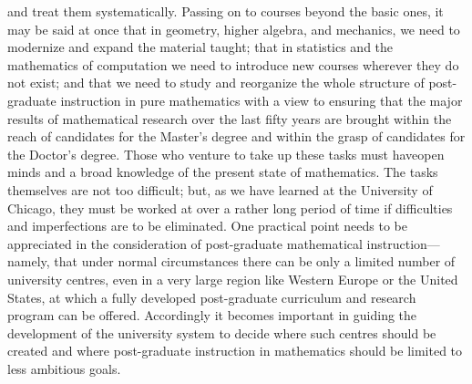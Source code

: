 and treat them systematically. Passing on to courses beyond the basic ones, it may be said at once that in geometry, higher algebra, and mechanics, we need to modernize and expand the material taught; that in statistics and the mathematics of computation we need to introduce new courses wherever they do not exist; and that we need to study and reorganize the whole structure of post-graduate instruction in pure mathematics with a view to ensuring that the major results of mathematical research over the last fifty years are brought within the reach of candidates for the Master's degree and within the grasp of candidates for the Doctor's degree. Those who venture to take up these tasks must have\pageoriginale open minds and a broad knowledge of the present state of mathematics. The tasks themselves are not too difficult; but, as we have learned at the University of Chicago, they must be worked at over a rather long period of time if difficulties and imperfections are to be eliminated. One practical point needs to be appreciated in the consideration of post-graduate mathematical instruction---namely, that under normal circumstances there can be only a limited number of university centres, even in a very large region like Western Europe or the United States, at which a fully developed post-graduate curriculum and research program can be offered. Accordingly it becomes important in guiding the development of the university system to decide where such centres should be created and where post-graduate instruction in mathematics should be limited to less ambitious goals.

